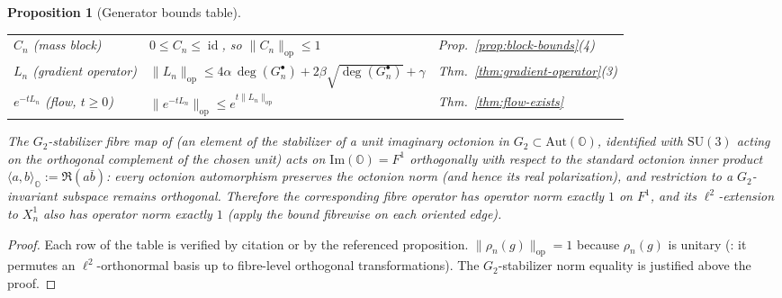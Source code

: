 \documentclass[11pt, a4paper]{amsart}
\newtheorem{proposition}[theorem]{Proposition}
\theoremstyle{definition}
\newcommand{\OO}{\mathbb{O}}
\newcommand{\id}{\operatorname{id}}
\newcommand{\op}{\operatorname{op}}
\renewcommand{\Im}{\mathrm{Im}}
\begin{document}
\begin{proposition}[Generator bounds table]
\begin{center}
\begin{tabular}{lll}
$C_n$ (mass block) & $0 \leq C_n \leq \id$, so $\|C_n\|_{\op} \leq 1$
  & Prop.~\ref{prop:block-bounds}(4) \\
$L_n$ (gradient operator) & $\|L_n\|_{\op} \leq
  4\alpha\,\deg(G_n^\bullet) + 2\beta\sqrt{\deg(G_n^\bullet)}
  + \gamma$ & Thm.~\ref{thm:gradient-operator}(3) \\
$e^{-t L_n}$ (flow, $t \geq 0$) & $\|e^{-t L_n}\|_{\op} \leq
  e^{t \|L_n\|_{\op}}$ & Thm.~\ref{thm:flow-exists} \\
\hline
\end{tabular}
\end{center}
The $G_2$-stabilizer fibre map of
\cite[Definitions~\texttt{def:G2}, \texttt{def:stab-u} and
Fact~\texttt{fact:SU3-stab}]{AlgebraicSubstrate} (an element
of the stabilizer of a unit imaginary octonion in $G_2 \subset
\mathrm{Aut}(\OO)$, identified with $\mathrm{SU}(3)$ acting on
the orthogonal complement of the chosen unit) acts on
$\Im(\OO) = F^1$ orthogonally with respect to the standard
octonion inner product $\langle a, b \rangle_\OO := \Re(a\bar b)$:
every octonion automorphism preserves the octonion norm
\cite[Theorem~6.6]{Schafer} (and hence its real polarization),
and restriction to a $G_2$-invariant subspace remains orthogonal.
Therefore the corresponding fibre operator has operator norm
exactly $1$ on $F^1$, and its $\ell^2$-extension to $X_n^1$ also
has operator norm exactly $1$ (apply the bound fibrewise on each
oriented edge).
\end{proposition}

\begin{proof}
Each row of the table is verified by citation or by the referenced
proposition. $\|\rho_n(g)\|_{\op} = 1$ because $\rho_n(g)$ is
unitary
(\cite[Lemma~\texttt{lem:coxeter-unitary}]{RefinementSpaces}: it
permutes an $\ell^2$-orthonormal basis up to fibre-level
orthogonal transformations). The $G_2$-stabilizer norm equality
is justified above the proof.
\end{proof}
\end{document}
